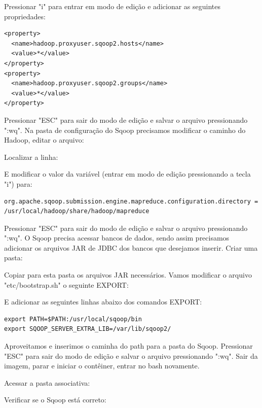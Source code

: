\documentclass[a4paper,11pt]{article}
\begin{document}
Pressionar "i" para entrar em modo de edição e adicionar as seguintes propriedades:
\begin{lstlisting}[]
<property>
  <name>hadoop.proxyuser.sqoop2.hosts</name>
  <value>*</value>
</property>
<property>
  <name>hadoop.proxyuser.sqoop2.groups</name>
  <value>*</value>
</property>
\end{lstlisting}

Pressionar "ESC" para sair do modo de edição e salvar o arquivo pressionando ":wq". Na pasta de configuração do Sqoop precisamos modificar o caminho do Hadoop, editar o arquivo: \\

Localizar a linha: \\

E modificar o valor da variável (entrar em modo de edição pressionando a tecla "i") para:
\begin{lstlisting}[]
org.apache.sqoop.submission.engine.mapreduce.configuration.directory = /usr/local/hadoop/share/hadoop/mapreduce
\end{lstlisting}

Pressionar "ESC" para sair do modo de edição e salvar o arquivo pressionando ":wq". O Sqoop precisa acessar bancos de dados, sendo assim precisamos adicionar os arquivos JAR de JDBC dos bancos que desejamos inserir. Criar uma pasta: \\

Copiar para esta pasta os arquivos JAR necessários. Vamos modificar o arquivo "etc/bootstrap.sh" o seguinte EXPORT: \\

E adicionar as seguintes linhas abaixo dos comandos EXPORT:
\begin{lstlisting}[]
export PATH=$PATH:/usr/local/sqoop/bin
export SQOOP_SERVER_EXTRA_LIB=/var/lib/sqoop2/
\end{lstlisting}

Aproveitamos e inserimos o caminha do path para a pasta do Sqoop. Pressionar "ESC" para sair do modo de edição e salvar o arquivo pressionando ":wq".  Sair da imagem, parar e iniciar o contêiner, entrar no bash novamente.

Acessar a pasta associativa: \\

Verificar se o Sqoop está correto: \\
\end{document}
